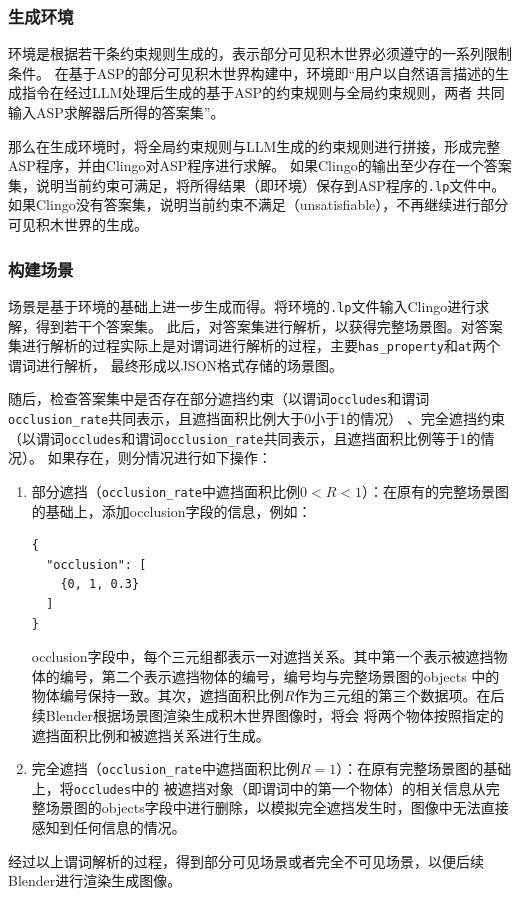 \subsubsection{生成环境}
环境是根据若干条约束规则生成的，表示部分可见积木世界必须遵守的一系列限制条件。
在基于ASP的部分可见积木世界构建中，环境即“用户以自然语言描述的生成指令在经过LLM处理后生成的基于ASP的约束规则与全局约束规则，两者
共同输入ASP求解器后所得的答案集”。

那么在生成环境时，将全局约束规则与LLM生成的约束规则进行拼接，形成完整ASP程序，并由Clingo对ASP程序进行求解。
如果Clingo的输出至少存在一个答案集，说明当前约束可满足，将所得结果（即环境）保存到ASP程序的\texttt{.lp}文件中。
如果Clingo没有答案集，说明当前约束不满足（unsatisfiable），不再继续进行部分可见积木世界的生成。
\subsubsection{构建场景}
场景是基于环境的基础上进一步生成而得。将环境的\texttt{.lp}文件输入Clingo进行求解，得到若干个答案集。
此后，对答案集进行解析，以获得完整场景图。对答案集进行解析的过程实际上是对谓词进行解析的过程，主要\texttt{has\_property}和\texttt{at}两个谓词进行解析，
最终形成以JSON格式存储的场景图。

随后，检查答案集中是否存在部分遮挡约束（以谓词\texttt{occludes}和谓词\texttt{occlusion\_rate}共同表示，且遮挡面积比例大于0小于1的情况）
、完全遮挡约束（以谓词\texttt{occludes}和谓词\texttt{occlusion\_rate}共同表示，且遮挡面积比例等于1的情况）。
如果存在，则分情况进行如下操作：
\begin{enumerate}[nosep]
\item 部分遮挡（\texttt{occlusion\_rate}中遮挡面积比例$0 < R < 1$）：在原有的完整场景图的基础上，添加occlusion字段的信息，例如：
\begin{lstlisting}
{
  "occlusion": [
    {0, 1, 0.3}
  ]
}
\end{lstlisting}
occlusion字段中，每个三元组都表示一对遮挡关系。其中第一个表示被遮挡物体的编号，第二个表示遮挡物体的编号，编号均与完整场景图的objects
中的物体编号保持一致。其次，遮挡面积比例$R$作为三元组的第三个数据项。在后续Blender根据场景图渲染生成积木世界图像时，将会
将两个物体按照指定的遮挡面积比例和被遮挡关系进行生成。
\item 完全遮挡（\texttt{occlusion\_rate}中遮挡面积比例$R = 1$）：在原有完整场景图的基础上，将\texttt{occludes}中的
被遮挡对象（即谓词中的第一个物体）的相关信息从完整场景图的objects字段中进行删除，以模拟完全遮挡发生时，图像中无法直接感知到任何信息的情况。
\end{enumerate}
经过以上谓词解析的过程，得到部分可见场景或者完全不可见场景，以便后续Blender进行渲染生成图像。

